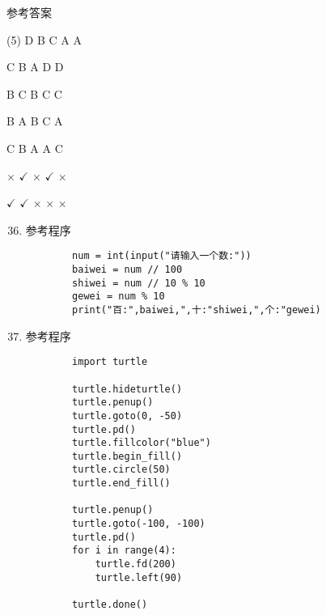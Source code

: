 \documentclass[11pt]{ctexart}
\begin{document}
\begin{center}
    \Huge \heiti 参考答案
\end{center}

    \begin{tasks}[label=\arabic*.](5)
        \task D 
        \task B 
        \task C 
        \task A 
        \task A 

        \task C
        \task B
        \task A
        \task D
        \task D

        \task B
        \task C
        \task B
        \task C
        \task C

        \task B
        \task A
        \task B
        \task C
        \task A

        \task C
        \task B
        \task A
        \task A
        \task C

        \task $\times$
        \task $\checkmark$
        \task $\times$
        \task $\checkmark$
        \task $\times$

        \task $\checkmark$
        \task $\checkmark$
        \task $\times$
        \task $\times$
        \task $\times$
    \end{tasks}

\begin{enumerate}
    \setcounter{enumi}{35}
    \item 参考程序
    \begin{lstlisting}
        num = int(input("请输入一个数:"))
        baiwei = num // 100
        shiwei = num // 10 % 10
        gewei = num % 10
        print("百:",baiwei,",十:"shiwei,",个:"gewei)
    \end{lstlisting}

    \item 参考程序
    \begin{lstlisting}
        import turtle

        turtle.hideturtle()
        turtle.penup()
        turtle.goto(0, -50)
        turtle.pd()
        turtle.fillcolor("blue")
        turtle.begin_fill()
        turtle.circle(50)
        turtle.end_fill()

        turtle.penup()
        turtle.goto(-100, -100)
        turtle.pd()
        for i in range(4):
            turtle.fd(200)
            turtle.left(90)

        turtle.done()
    \end{lstlisting}
\end{enumerate}
\end{document}
